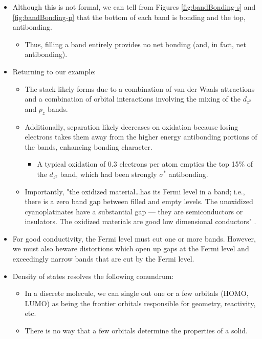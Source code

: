 \documentclass[../notes.tex]{subfiles}
\begin{document}
\begin{itemize}
    \item Although this is not formal, we can tell from Figures \ref{fig:bandBonding-s} and \ref{fig:bandBonding-p} that the bottom of each band is bonding and the top, antibonding.
    \begin{itemize}
        \item Thus, filling a band entirely provides no net bonding (and, in fact, net antibonding).
    \end{itemize}
    \item Returning to our  example:
    \begin{itemize}
        \item The stack likely forms due to a combination of van der Waals attractions and a combination of orbital interactions involving the mixing of the $d_{z^2}$ and $p_z$ bands.
        \item Additionally,  separation likely decreases on oxidation because losing electrons takes them away from the higher energy antibonding portions of the bands, enhancing bonding character.
        \begin{itemize}
            \item A typical oxidation of 0.3 electrons per  atom empties the top 15\% of the $d_{z^2}$ band, which had been strongly $\sigma^*$ antibonding.
        \end{itemize}
        \item Importantly, "the oxidized material\dots has its Fermi level in a band; i.e., there is a zero band gap between filled and empty levels. The unoxidized cyanoplatinates have a substantial gap --- they are semiconductors or insulators. The oxidized materials are good low dimensional conductors" \parencite[851-52]{bib:bandTheory}.
    \end{itemize}
    \item For good conductivity, the Fermi level must cut one or more bands. However, we must also beware distortions which open up gaps at the Fermi level and exceedingly narrow bands that are cut by the Fermi level.
    \item Density of states resolves the following conundrum:
    \begin{itemize}
        \item In a discrete molecule, we can single out one or a few orbitals (HOMO, LUMO) as being the frontier orbitals responsible for geometry, reactivity, etc.
        \item There is no way that a few orbitals determine the properties of a solid.

\end{itemize}
\end{itemize}
\end{document}
